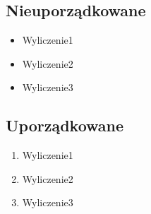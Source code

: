 \documentclass{report}
\begin{document}
        \subsection{Nieuporządkowane}
            \begin{itemize}
                \item Wyliczenie1
                \item Wyliczenie2
                \item Wyliczenie3
            \end{itemize}

        \subsection{Uporządkowane}
            \begin{enumerate}
                \item Wyliczenie1
                \item Wyliczenie2
                \item Wyliczenie3
            \end{enumerate}
\end{document}
